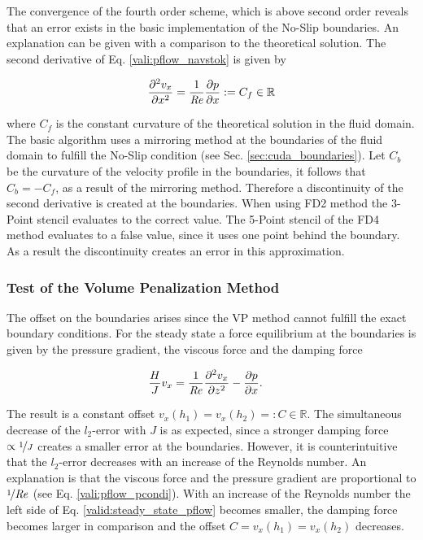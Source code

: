 The convergence of the fourth order scheme, which is above second order
reveals that an error exists in the basic implementation of the No-Slip boundaries.
An explanation can be given with a comparison to the theoretical solution.
The second derivative of Eq. \ref{vali:pflow_navstok}  is given by

\begin{align}
    \pdn[^2 v_x]{x^2} = \frac{1}{\Rey}\pdn[p]{x} := C_f\in\mathbb{R}
\end{align}

where $C_f$ is the constant curvature of the theoretical solution in the fluid domain.
The basic algorithm uses a mirroring method at the boundaries of the fluid domain to fulfill the No-Slip condition (see Sec. \ref{sec:cuda_boundaries}).
Let $C_b$ be the curvature of the velocity profile in the boundaries, it follows that $C_b = - C_f$, as a result of the mirroring method.
Therefore a discontinuity of the second derivative is created at the boundaries.
When using FD2 method the 3-Point stencil evaluates to the correct value.
The 5-Point stencil of the FD4 method evaluates to a false value, since it uses one point behind the boundary.
As a result the discontinuity creates an error in this approximation.

\clearpage

\subsubsection{Test of the Volume Penalization Method}

The offset on the boundaries arises since the VP method cannot fulfill the exact boundary conditions.
For the steady state a force equilibrium at the boundaries is given by the pressure gradient, the viscous force and the damping force

\begin{align}
\label{valid:steady_state_pflow}
 \frac{H}{J} v_x &=  \frac{1}{\Rey}\frac{\partial^2 v_x}{\partial z^2} -\pdn[p]{x}.
\end{align}

The result is a constant offset $v_x(h_1) = v_x(h_2) =: C\in\mathbb{R}$.
The simultaneous decrease of the $l_2$-error with $J$ is as expected, since a stronger damping force $\propto \nicefrac{1}{J}$ creates a smaller
error at the boundaries.
However, it is counterintuitive that the $l_2$-error decreases with an increase of the Reynolds number.
An explanation is that the viscous force and the pressure gradient are proportional to $\nicefrac{1}{\Rey}$
(see Eq. \ref{vali:pflow_pcondi}).
With an increase of the Reynolds number the left side of Eq. \ref{valid:steady_state_pflow} becomes smaller,
the damping force becomes larger in comparison and the  offset $C=v_x(h_1)=v_x(h_2)$ decreases.

